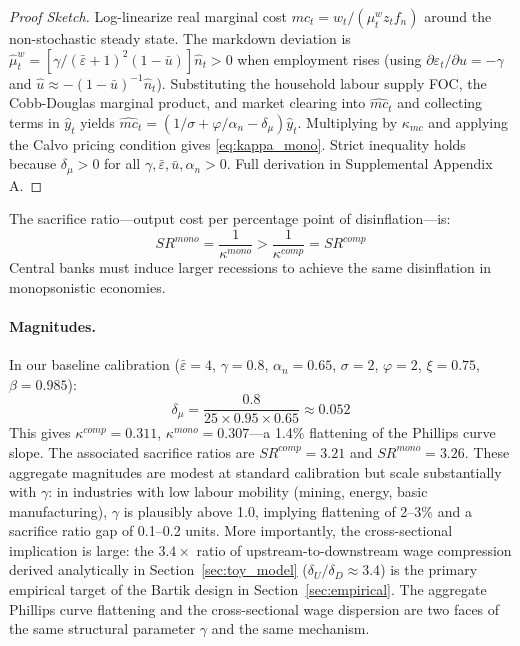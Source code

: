 \begin{proof}[Proof Sketch]
  Log-linearize real marginal cost $mc_t = w_t/(\mu_t^w z_t f_n)$ around the
  non-stochastic steady state. The markdown deviation is
  $\hat\mu_t^w = [\gamma/(\bar\varepsilon+1)^2(1-\bar u)]\hat n_t > 0$ when
  employment rises (using $\partial\varepsilon_t/\partial u = -\gamma$ and
  $\hat u \approx -(1-\bar u)^{-1}\hat n_t$). Substituting the household
  labour supply FOC, the Cobb-Douglas marginal product, and market clearing
  into $\hat{mc}_t$ and collecting terms in $\hat y_t$ yields
  $\hat{mc}_t = (1/\sigma + \varphi/\alpha_n - \delta_\mu)\hat y_t$.
  Multiplying by $\kappa_{mc}$ and applying the Calvo pricing condition gives
  \eqref{eq:kappa_mono}. Strict inequality holds because $\delta_\mu > 0$
  for all $\gamma, \bar\varepsilon, \bar u, \alpha_n > 0$.
  Full derivation in Supplemental Appendix A.
\end{proof}

\begin{corollary}
  \label{cor:sacrifice_ratio}
  The sacrifice ratio---output cost per percentage point of
  disinflation---is:
  \begin{equation}
    SR^{mono} = \frac{1}{\kappa^{mono}} > \frac{1}{\kappa^{comp}} = SR^{comp}
    \label{eq:sacrifice_ratio}
  \end{equation}
  Central banks must induce larger recessions to achieve the same disinflation
  in monopsonistic economies.
\end{corollary}

\paragraph{Magnitudes.}
In our baseline calibration ($\bar\varepsilon = 4$, $\gamma = 0.8$,
$\alpha_n = 0.65$, $\sigma = 2$, $\varphi = 2$, $\xi = 0.75$, $\beta = 0.985$):
\begin{equation*}
  \delta_\mu = \frac{0.8}{25 \times 0.95 \times 0.65} \approx 0.052
\end{equation*}
This gives $\kappa^{comp} = 0.311$, $\kappa^{mono} = 0.307$---a
1.4\% flattening of the Phillips curve slope. The associated sacrifice ratios
are $SR^{comp} = 3.21$ and $SR^{mono} = 3.26$. These aggregate magnitudes are
modest at standard calibration but scale substantially with $\gamma$: in
industries with low labour mobility (mining, energy, basic manufacturing),
$\gamma$ is plausibly above 1.0, implying flattening of 2--3\% and a sacrifice
ratio gap of 0.1--0.2 units. More importantly, the cross-sectional
implication is large: the $3.4\times$ ratio of upstream-to-downstream
wage compression derived analytically in Section~\ref{sec:toy_model}
($\delta_U/\delta_D \approx 3.4$) is the primary empirical target
of the Bartik design in Section~\ref{sec:empirical}. The aggregate Phillips
curve flattening and the cross-sectional wage dispersion are two faces of
the same structural parameter $\gamma$ and the same mechanism.

